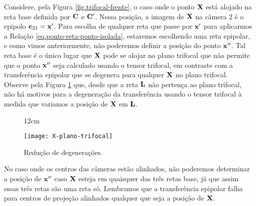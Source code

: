Considere, pela Figura \ref{fig.trifocal-frente}, o caso onde o ponto $\mathbf{X}$ está alojado na reta base definida por ${\bf C}$ e ${\bf C}'$. Nessa posição, a imagem de $\mathbf{X}$ na câmera 2 é o epipolo $\boldsymbol{e}_{21}=\mathbf{x}'$. Para escolha de qualquer reta que passe por $\mathbf{x}'$ para aplicarmos a Relação \ref{eq.ponto-reta-ponto-isolada}, estaremos escolhendo uma reta epipolar, e como vimos anteriormente, não poderemos definir a posição do ponto $\mathbf{x}''$. Tal reta base é o único lugar que $\mathbf{X}$ pode se alojar no plano trifocal que não permite que o ponto $\mathbf{x}''$ seja calculado usando o tensor trifocal, em contraste com a transferência epipolar que se degenera para qualquer $\mathbf{X}$ no plano trifocal. Observe pela Figura \ref{fig.X-plano-trifocal} que, desde que a reta ${\bf L}$ não pertença ao plano trifocal, não há motivos para a degeneração da transferência usando o tensor trifocal à medida que variamos a posição de $\mathbf{X}$ em ${\bf L}$. 
\begin{figure}[!htb]{12cm}
\caption{Reduç\~ao de degeneraç\~oes.}
\texttt{[image: X-plano-trifocal]}
\label{fig.X-plano-trifocal}
\end{figure}
No caso onde os centros das câmeras estão alinhados, não poderemos determinar a posição de $\mathbf{x}''$ caso $\mathbf{X}$ esteja em quaisquer das três retas base, já que assim essas três retas são uma reta só. Lembramos que a transferência epipolar falha para centros de projeção alinhados qualquer que seja a posição de $\mathbf{X}$.  
